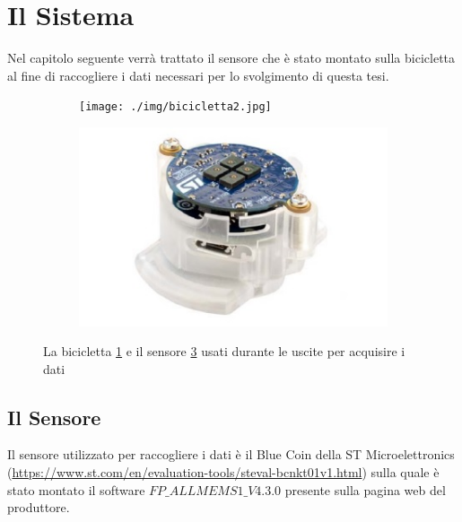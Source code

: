 \documentclass[class=article]{standalone}
\begin{document}
	\section{Il Sistema}
	Nel capitolo seguente verrà trattato il sensore che è stato montato sulla bicicletta al fine di raccogliere i dati necessari per lo svolgimento di questa tesi. 
	
	\begin{figure}[h]
		\begin{subfigure}[h]{0.5\textwidth}
			\centering\texttt{[image: ./img/bicicletta2.jpg]}
			\caption{}
			\label{fig:bici}
		\end{subfigure}
		\begin{subfigure}[h]{0.5\textwidth}
			\centering\includegraphics[width=0.8\linewidth]{./img/bluecoin.jpg}
			\caption{}
			\label{fig:sensore}
		\end{subfigure}
		
		\caption[]{La bicicletta \ref{fig:bici} e il sensore \ref{fig:sensore} usati durante le uscite per acquisire i dati}
	\end{figure}
	
	\subsection{Il Sensore}
	Il sensore utilizzato per raccogliere i dati è il Blue Coin della ST Microelettronics (\url{https://www.st.com/en/evaluation-tools/steval-bcnkt01v1.html}) sulla quale è stato montato il software \(FP\_ALLMEMS1\_V4.3.0\) presente sulla pagina web del produttore.\hfill\break
	
\end{document}
